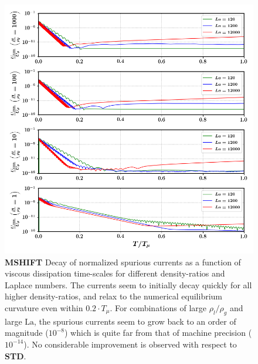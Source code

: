 \begin{figure}[h!]
    \centering
    \includegraphics[]{plots/static_drop/decay_daniel.png}
	\caption{\textbf{MSHIFT} Decay of normalized spurious currents as a function of viscous dissipation time-scales for different density-ratios and Laplace numbers. The currents seem to initially decay quickly for all higher density-ratios, and relax to the numerical equilibrium curvature even within $0.2 \cdot T_\mu$. For combinations of large $\rho_l / \rho_g$ and large $\textrm{La}$, the spurious currents seem to grow back to an order of magnitude ($10^{-8}$) which is quite far from that of machine precision ($10^{-14}$). No considerable improvement is observed with respect to \textbf{STD}. }   
    \label{decay_daniel}
\end{figure}


